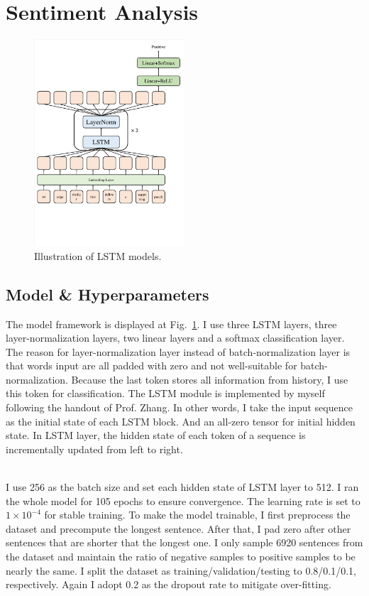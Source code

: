 
\section{Sentiment Analysis}
\begin{figure}
    \centering
    \includegraphics[width=0.5\textwidth]{lstm_model.pdf}
    \caption{Illustration of LSTM models.}
    \label{fig:lstm_model}
\end{figure}
\subsection{Model \& Hyperparameters}
The model framework is displayed at Fig.~\ref{fig:lstm_model}. I use three LSTM layers, three layer-normalization layers, two linear layers and a softmax classification layer. 
The reason for layer-normalization layer instead of batch-normalization layer is that words input are all padded with zero and not well-suitable for batch-normalization.
Because the last token stores all information from history, I use this token for classification.
The LSTM module is implemented by myself following the handout of Prof. Zhang.
In other words, I take the input sequence as the initial state of each LSTM block. And an all-zero tensor for initial hidden state.
In LSTM layer, the hidden state of each token of a sequence is incrementally updated from left to right.

\hspace*{\fill} \\
\noindent
I use 256 as the batch size and set each hidden state of LSTM layer to 512.
I ran the whole model for 105 epochs to ensure convergence.
The learning rate is set to $1\times 10^{-4}$ for stable training.
To make the model trainable, I first preprocess the dataset and precompute the longest sentence.
After that, I pad zero after other sentences that are shorter that the longest one.
I only sample 6920 sentences from the dataset and maintain the ratio of negative samples to positive samples to be nearly the same.
I split the dataset as training/validation/testing to 0.8/0.1/0.1, respectively.
Again I adopt 0.2 as the dropout rate to mitigate over-fitting.


